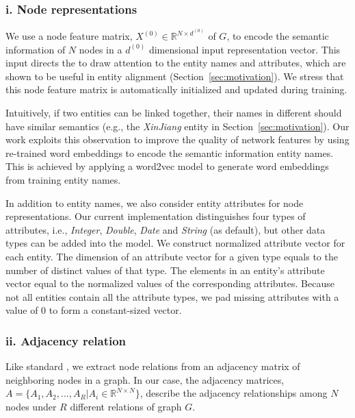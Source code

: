 \subsubsection{i. Node representations}
	\label{subsection:Node Representations}
   We use a node feature matrix, $X^{(0)} \in \mathbb{R}^{N \times d^{(0)}}$ of $G$, to encode the semantic information of $N$  nodes in a $d^{(0)}$ dimensional input representation vector.
   This input directs the \RGCN to draw attention to the entity names and attributes, which are shown to be useful in entity
   alignment (Section~\ref{sec:motivation}). We stress that this node feature matrix is automatically initialized and updated during training.

	
	\label{wordvector}
	Intuitively, if two entities can be linked together, their names in different \KGs should have similar semantics (e.g., the \emph{XinJiang} entity in Section~\ref{sec:motivation}).
    Our work exploits this observation to improve the quality of network features by using re-trained word embeddings to encode the semantic
    information entity names. This is achieved by applying a word2vec model to generate word embeddings from training entity names.

	
    In addition to entity names, we also consider entity attributes for node representations.
	Our current implementation distinguishes four types of attributes, i.e., \emph{Integer}, \emph{Double}, \emph{Date} and \emph{String}
(as default), but other data types can be added into the model.
%	
	We construct normalized attribute vector for each entity. The dimension of an attribute vector for a given type equals to the number of distinct values of that type.
	The elements in an entity's attribute vector equal to the normalized values of the corresponding attributes. 
    Because not all entities contain all the attribute types, we pad missing attributes with a value of 0 to form a constant-sized  vector.

 \subsubsection{ii. Adjacency relation}
 Like standard \GCNs, we extract node relations from an adjacency matrix of neighboring nodes in a graph.
 In our case, the adjacency matrices, $A=\{A_1,A_2,...,A_R |A_i \in \mathbb{R}^{N
 \times N} \}$, describe the adjacency relationships among $N$ nodes under $R$ different relations of graph $G$.

